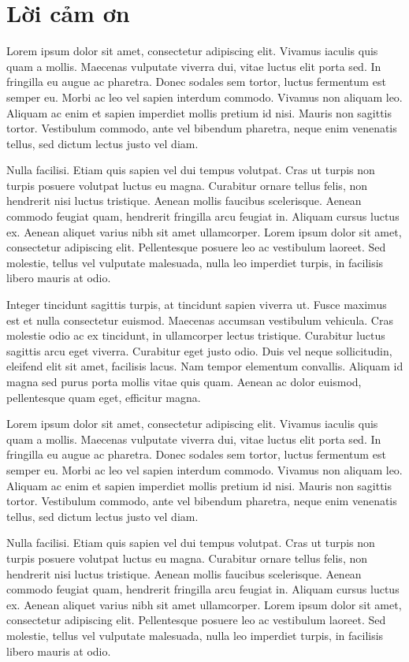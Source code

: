 \chapter*{Lời cảm ơn}

Lorem ipsum dolor sit amet, consectetur adipiscing elit. Vivamus iaculis quis quam a mollis. Maecenas vulputate viverra dui, vitae luctus elit porta sed. In fringilla eu augue ac pharetra. Donec sodales sem tortor, luctus fermentum est semper eu. Morbi ac leo vel sapien interdum commodo. Vivamus non aliquam leo. Aliquam ac enim et sapien imperdiet mollis pretium id nisi. Mauris non sagittis tortor. Vestibulum commodo, ante vel bibendum pharetra, neque enim venenatis tellus, sed dictum lectus justo vel diam.\par
Nulla facilisi. Etiam quis sapien vel dui tempus volutpat. Cras ut turpis non turpis posuere volutpat luctus eu magna. Curabitur ornare tellus felis, non hendrerit nisi luctus tristique. Aenean mollis faucibus scelerisque. Aenean commodo feugiat quam, hendrerit fringilla arcu feugiat in. Aliquam cursus luctus ex. Aenean aliquet varius nibh sit amet ullamcorper. Lorem ipsum dolor sit amet, consectetur adipiscing elit. Pellentesque posuere leo ac vestibulum laoreet. Sed molestie, tellus vel vulputate malesuada, nulla leo imperdiet turpis, in facilisis libero mauris at odio.\par
Integer tincidunt sagittis turpis, at tincidunt sapien viverra ut. Fusce maximus est et nulla consectetur euismod. Maecenas accumsan vestibulum vehicula. Cras molestie odio ac ex tincidunt, in ullamcorper lectus tristique. Curabitur luctus sagittis arcu eget viverra. Curabitur eget justo odio. Duis vel neque sollicitudin, eleifend elit sit amet, facilisis lacus. Nam tempor elementum convallis. Aliquam id magna sed purus porta mollis vitae quis quam. Aenean ac dolor euismod, pellentesque quam eget, efficitur magna.\par
Lorem ipsum dolor sit amet, consectetur adipiscing elit. Vivamus iaculis quis quam a mollis. Maecenas vulputate viverra dui, vitae luctus elit porta sed. In fringilla eu augue ac pharetra. Donec sodales sem tortor, luctus fermentum est semper eu. Morbi ac leo vel sapien interdum commodo. Vivamus non aliquam leo. Aliquam ac enim et sapien imperdiet mollis pretium id nisi. Mauris non sagittis tortor. Vestibulum commodo, ante vel bibendum pharetra, neque enim venenatis tellus, sed dictum lectus justo vel diam.\par
Nulla facilisi. Etiam quis sapien vel dui tempus volutpat. Cras ut turpis non turpis posuere volutpat luctus eu magna. Curabitur ornare tellus felis, non hendrerit nisi luctus tristique. Aenean mollis faucibus scelerisque. Aenean commodo feugiat quam, hendrerit fringilla arcu feugiat in. Aliquam cursus luctus ex. Aenean aliquet varius nibh sit amet ullamcorper. Lorem ipsum dolor sit amet, consectetur adipiscing elit. Pellentesque posuere leo ac vestibulum laoreet. Sed molestie, tellus vel vulputate malesuada, nulla leo imperdiet turpis, in facilisis libero mauris at odio.\par
